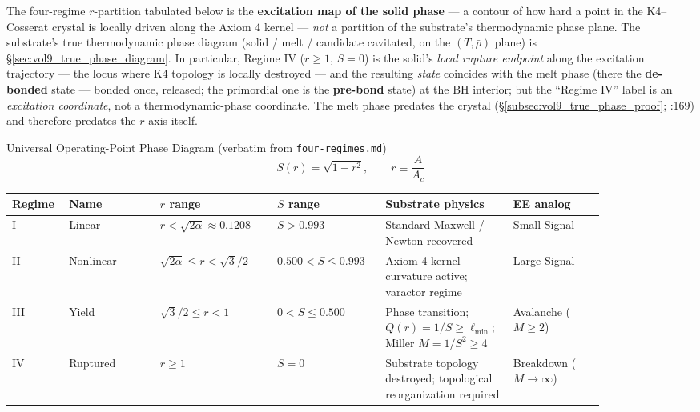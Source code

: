 \begin{warningbox}
The four-regime $r$-partition tabulated below is the \textbf{excitation map of the solid phase} --- a contour of how hard a point in the K4--Cosserat crystal is locally driven along the Axiom 4 kernel --- \emph{not} a partition of the substrate's thermodynamic phase plane. The substrate's true thermodynamic phase diagram (solid / melt / candidate cavitated, on the $(T, \bar\rho)$ plane) is \S\ref{sec:vol9_true_phase_diagram}. In particular, Regime IV ($r \ge 1$, $S = 0$) is the solid's \emph{local rupture endpoint} along the excitation trajectory --- the locus where K4 topology is locally destroyed --- and the resulting \emph{state} coincides with the melt phase (there the \textbf{de-bonded} state --- bonded once, released; the primordial one is the \textbf{pre-bond} state) at the BH interior; but the ``Regime IV'' label is an \emph{excitation coordinate}, not a thermodynamic-phase coordinate. The melt phase predates the crystal (\S\ref{subsec:vol9_true_phase_proof}; :169) and therefore predates the $r$-axis itself.
\end{warningbox}

\begin{resultbox}{Universal Operating-Point Phase Diagram (verbatim from \texttt{four-regimes.md})}
\begin{equation}
    S(r) = \sqrt{1 - r^2}, \qquad r \equiv \frac{A}{A_c}
\end{equation}

\begin{center}\small
\begin{tabular}{p{0.06\linewidth} p{0.14\linewidth} p{0.18\linewidth} p{0.16\linewidth} p{0.18\linewidth} p{0.14\linewidth}}
\toprule
\textbf{Regime} & \textbf{Name} & \textbf{$r$ range} & \textbf{$S$ range} & \textbf{Substrate physics} & \textbf{EE analog} \\
\midrule
I  & Linear     & $r < \sqrt{2\alpha} \approx 0.1208$        & $S > 0.993$        & Standard Maxwell / Newton recovered                              & Small-Signal \\
II & Nonlinear  & $\sqrt{2\alpha} \le r < \sqrt{3}/2$        & $0.500 < S \le 0.993$ & Axiom 4 kernel curvature active; varactor regime              & Large-Signal \\
III & Yield     & $\sqrt{3}/2 \le r < 1$                     & $0 < S \le 0.500$  & Phase transition; $Q(r) = 1/S \ge \ell_{\min}$; Miller $M = 1/S^2 \ge 4$ & Avalanche ($M \ge 2$) \\
IV & Ruptured   & $r \ge 1$                                   & $S = 0$            & Substrate topology destroyed; topological reorganization required & Breakdown ($M \to \infty$) \\
\bottomrule
\end{tabular}
\end{center}
\end{resultbox}

